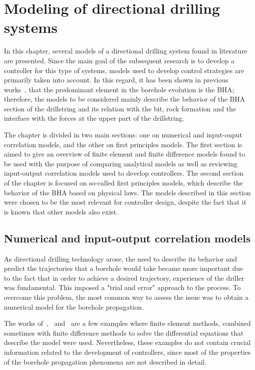 %

\chapter{Modeling of directional drilling systems}\label{chapter:Modeling}

In this chapter, several models of a directional drilling system found in literature are presented. Since the main goal of the subsequent research is to develop a controller for this type of systems, models used to develop control strategies are primarily taken into account. In this regard, it has been shown in previous works~\cite{Perneder2013}, that the predominant element in the borehole evolution is the \acs{BHA}; therefore, the models to be considered mainly describe the behavior of the BHA section of the drillstring and its relation with the bit, rock formation and the interface with the forces at the upper part of the drillstring.

The chapter is divided in two main sections: one on numerical and input-ouput correlation models, and the other on first principles models. The first section is aimed to give an overview of finite element and finite difference models found to be used with the purpose of comparing analytical models as well as reviewing input-output correlation models used to develop controllers. The second section of the chapter is focused on so-called first principles models, which describe the behavior of the \acs{BHA} based on physical laws. The models described in this section were chosen to be the most relevant for controller design, despite the fact that it is known that other models also exist.

\section{Numerical and input-output correlation models}\label{section:NumModels}

As directional drilling technology arose, the need to describe its behavior and predict the trajectories that a borehole would take became more important due to the fact that in order to achieve a desired trajectory, experience of the driller was fundamental. This imposed a "trial and error" approach to the process. To overcome this problem, the most common way to assess the issue was to obtain a numerical model for the borehole propagation. 

The works of~\cite{Call81},~\cite{Mill82} and~\cite{Rafi88} are a few examples where finite element methods, combined sometimes with finite difference methods to solve the differential equations that describe the model were used. Nevertheless, these examples do not contain crucial information related to the development of controllers, since most of the properties of the borehole propagation phenomena are not described in detail.

